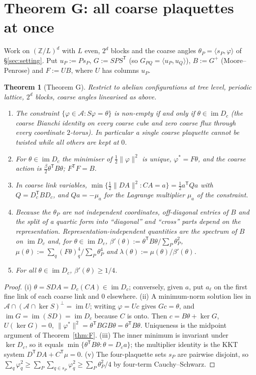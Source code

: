 \documentclass[11pt,a4paper]{article}
\newtheorem{theorem}{Theorem}[section]
\theoremstyle{definition}
\theoremstyle{remark}
\newcommand{\cA}{\mathcal{A}}
\newcommand{\im}{\operatorname{im}}
\begin{document}
\section{Theorem G: all coarse plaquettes at once}\label{sec:G}

Work on $(\mathbb{Z}/L)^d$ with $L$ even, $2^d$ blocks and the coarse angles $\theta_P=\langle s_P,\varphi\rangle$ of \S\ref{sec:setting}. Put $u_P:=Ps_P$, $G:=SPS^{\mathsf T}$ (so $G_{PQ}=\langle u_P,u_Q\rangle$), $B:=G^{+}$ (Moore--Penrose) and $F:=UB$, where $U$ has columns $u_P$.

\begin{theorem}[Theorem G]\label{thm:G}
Restrict to abelian configurations at tree level, periodic lattice, $2^d$ blocks, coarse angles linearised as above.
\begin{enumerate}[label=(\roman*)]
\item The constraint $\{\varphi\in\cA:S\varphi=\theta\}$ is non-empty if and only if $\theta\in\im D_c$ (the coarse Bianchi identity on every coarse cube and zero coarse flux through every coordinate $2$-torus). In particular a single coarse plaquette cannot be twisted while all others are kept at $0$.
\item For $\theta\in\im D_c$ the minimiser of $\frac12\|\varphi\|^2$ is unique, $\varphi^*=F\theta$, and the coarse action is $\frac\beta2\theta^{\mathsf T}B\theta$; $F^{\mathsf T}F=B$.
\item In coarse link variables, $\min\{\frac12\|DA\|^2:CA=a\}=\frac12a^{\mathsf T}Qa$ with $Q=D_c^{\mathsf T}BD_c$, and $Qa=-\mu_a$ for the Lagrange multiplier $\mu_a$ of the constraint.
\item Because the $\theta_P$ are not independent coordinates, off-diagonal entries of $B$ and the split of a quartic form into ``diagonal'' and ``cross'' parts depend on the representation. Representation-independent quantities are the spectrum of $B$ on $\im D_c$ and, for $\theta\in\im D_c$, $\beta'(\theta):=\theta^{\mathsf T}B\theta/\sum_P\theta_P^2$, $\mu(\theta):=\sum_q(F\theta)_q^4/\sum_P\theta_P^4$ and $\lambda(\theta):=\mu(\theta)/\beta'(\theta)$.
\item For all $\theta\in\im D_c$, $\beta'(\theta)\ge1/4$.
\end{enumerate}
\end{theorem}

\begin{proof}
(i) $\theta=SDA=D_c(CA)\in\im D_c$; conversely, given $a$, put $a_\ell$ on the first fine link of each coarse link and $0$ elsewhere. (ii) A minimum-norm solution lies in $\cA\cap(\cA\cap\ker S)^\perp=\im U$; writing $\varphi=Uc$ gives $Gc=\theta$, and $\im G=\im(SD)=\im D_c$ because $C$ is onto. Then $c=B\theta+\ker G$, $U(\ker G)=0$, $\|\varphi^*\|^2=\theta^{\mathsf T}BGB\theta=\theta^{\mathsf T}B\theta$. Uniqueness is the midpoint argument of Theorem~\ref{thm:F}. (iii) The inner minimum is invariant under $\ker D_c$, so it equals $\min\{\theta^{\mathsf T}B\theta:\theta=D_ca\}$; the multiplier identity is the KKT system $D^{\mathsf T}DA+C^{\mathsf T}\mu=0$. (v) The four-plaquette sets $s_P$ are pairwise disjoint, so $\sum_q\varphi_q^2\ge\sum_P\sum_{q\in s_P}\varphi_q^2\ge\sum_P\theta_P^2/4$ by four-term Cauchy--Schwarz.
\end{proof}
\end{document}
